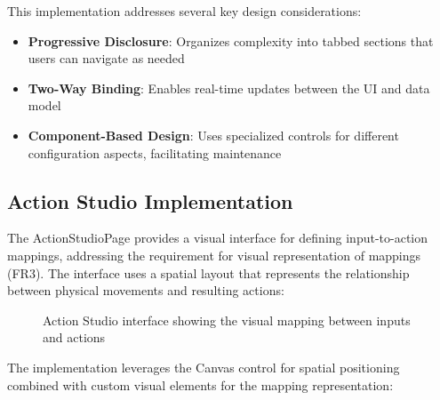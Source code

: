 This implementation addresses several key design considerations:

\begin{itemize}
    \item \textbf{Progressive Disclosure}: Organizes complexity into tabbed sections that users can navigate as needed
    \item \textbf{Two-Way Binding}: Enables real-time updates between the UI and data model
    \item \textbf{Component-Based Design}: Uses specialized controls for different configuration aspects, facilitating maintenance
\end{itemize}

\subsection{Action Studio Implementation}
The ActionStudioPage provides a visual interface for defining input-to-action mappings, addressing the requirement for visual representation of mappings (FR3). The interface uses a spatial layout that represents the relationship between physical movements and resulting actions:

\begin{figure}[h]
\centering
\caption{Action Studio interface showing the visual mapping between inputs and actions}
\label{fig:action_studio}
\end{figure}

The implementation leverages the Canvas control for spatial positioning combined with custom visual elements for the mapping representation:

